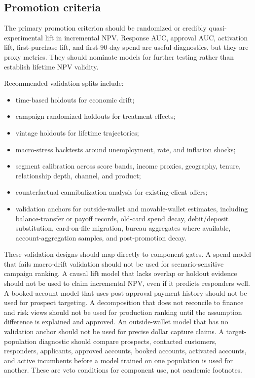 \documentclass[11pt]{article}
\newcommand{\1}{\mathbf{1}}
\begin{document}
\subsection{Promotion criteria}

The primary promotion criterion should be randomized or credibly
quasi-experimental lift in incremental NPV. Response AUC, approval AUC,
activation lift, first-purchase lift, and first-90-day spend are useful
diagnostics, but they are proxy metrics. They should nominate models for
further testing rather than establish lifetime NPV validity.

Recommended validation splits include:
\begin{itemize}[leftmargin=*]
  \item time-based holdouts for economic drift;
  \item campaign randomized holdouts for treatment effects;
  \item vintage holdouts for lifetime trajectories;
  \item macro-stress backtests around unemployment, rate, and inflation shocks;
  \item segment calibration across score bands, income proxies, geography,
        tenure, relationship depth, channel, and product;
  \item counterfactual cannibalization analysis for existing-client offers;
  \item validation anchors for outside-wallet and movable-wallet estimates,
        including balance-transfer or payoff records, old-card spend decay,
        debit/deposit substitution, card-on-file migration, bureau aggregates
        where available, account-aggregation samples, and post-promotion decay.
\end{itemize}

These validation designs should map directly to component gates. A spend model
that fails macro-drift validation should not be used for scenario-sensitive
campaign ranking. A causal lift model that lacks overlap or holdout evidence
should not be used to claim incremental NPV, even if it predicts responders
well. A booked-account model that uses post-approval payment history should not
be used for prospect targeting. A decomposition that does not reconcile to
finance and risk views should not be used for production ranking until the
assumption difference is explained and approved. An outside-wallet model that
has no validation anchor should not be used for precise dollar capture claims.
A target-population diagnostic should compare prospects, contacted customers,
responders, applicants, approved accounts, booked accounts, activated accounts,
and active incumbents before a model trained on one population is used for
another. These are veto conditions for component use, not academic footnotes.
\end{document}
